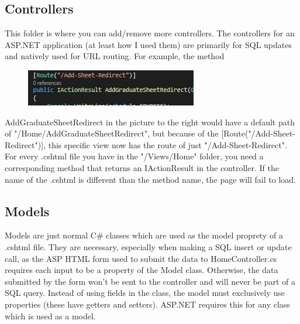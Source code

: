 \documentclass[12pt]{article}
\begin{document}
		\subsection{Controllers}
			This folder is where you can add/remove more controllers. The controllers for an ASP.NET application (at least how I used them) are primarily for SQL updates and natively used for URL routing. For example, the method
			\begin{figure}
				\centering
				\vspace*{-.55cm}\includegraphics[width=1\linewidth]{images/routeexample}
			\end{figure} AddGraduateSheetRedirect in the picture to the right would have a default path of "/Home/AddGraduateSheetRedirect", but because of the [Route("/Add-Sheet-Redirect")], this specific view now has the route of just "/Add-Sheet-Redirect". For every .cshtml file you have in the "/Views/Home" folder, you need a corresponding method that returns an IActionResult in the controller. If the name of the .cshtml is different than the method name, the page will fail to load.

		\subsection{Models}
			Models are just normal C\# classes which are used as the model proprety of a .cshtml file. They are necessary, especially when making a SQL insert or update call, as the ASP HTML form used to submit the data to HomeController.cs requires each input to be a property of the Model class. Otherwise, the data submitted by the form won't be sent to the controller and will never be part of a SQL query. Instead of using fields in the class, the model must exclusively use properties (these have getters and setters). ASP.NET requires this for any class which is used as a model.
			
		\pagebreak
		
\end{document}
